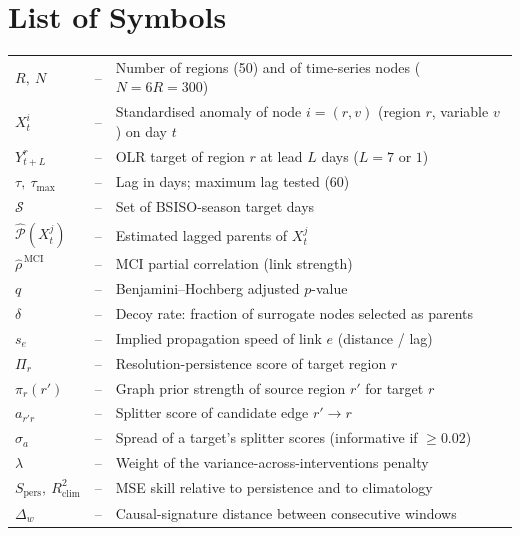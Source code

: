 \chapter*{List of Symbols}
\begin{tabular}{p{2.5cm}p{0.3cm}p{11.5cm}}
$R,\ N$ & -- & Number of regions (50) and of time-series nodes ($N=6R=300$)\\
$X^{i}_t$ & -- & Standardised anomaly of node $i=(r,v)$ (region $r$, variable $v$) on day $t$\\
$Y^{r}_{t+L}$ & -- & OLR target of region $r$ at lead $L$ days ($L=7$ or $1$)\\
$\tau,\ \tau_{\max}$ & -- & Lag in days; maximum lag tested (60)\\
$\mathcal{S}$ & -- & Set of BSISO-season target days\\
$\hat{\mathcal{P}}(X^j_t)$ & -- & Estimated lagged parents of $X^j_t$\\
$\hat\rho^{\,\mathrm{MCI}}$ & -- & MCI partial correlation (link strength)\\
$q$ & -- & Benjamini--Hochberg adjusted $p$-value\\
$\delta$ & -- & Decoy rate: fraction of surrogate nodes selected as parents\\
$s_e$ & -- & Implied propagation speed of link $e$ (distance / lag)\\
$\Pi_r$ & -- & Resolution-persistence score of target region $r$\\
$\pi_r(r')$ & -- & Graph prior strength of source region $r'$ for target $r$\\
$a_{r'r}$ & -- & Splitter score of candidate edge $r'\to r$\\
$\sigma_a$ & -- & Spread of a target's splitter scores (informative if $\ge 0.02$)\\
$\lambda$ & -- & Weight of the variance-across-interventions penalty\\
$S_{\mathrm{pers}},\ R^2_{\mathrm{clim}}$ & -- & MSE skill relative to persistence and to climatology\\
$\Delta_w$ & -- & Causal-signature distance between consecutive windows\\
\end{tabular}
